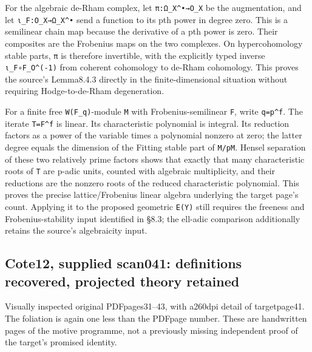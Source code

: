 \documentclass[
  10pt,
]{article}
\begin{document}
For the algebraic de-Rham complex, let
\texttt{\small π:\allowbreak{}Ω\_\allowbreak{}X\textasciicircum{}•→\allowbreak{}O\_\allowbreak{}X}
be the augmentation, and let
\texttt{\small ι\_\allowbreak{}F:\allowbreak{}O\_\allowbreak{}X→\allowbreak{}Ω\_\allowbreak{}X\textasciicircum{}•}
send a function to its pth power in degree zero. This is a semilinear
chain map because the derivative of a pth power is zero. Their
composites are the Frobenius maps on the two complexes. On
hypercohomology stable parts, \texttt{\small π} is therefore invertible,
with the explicitly typed inverse
\texttt{\small ι\_\allowbreak{}F∘F\_\allowbreak{}O\textasciicircum{}(\allowbreak{}-\allowbreak{}1)\allowbreak{}}
from coherent cohomology to de-Rham cohomology. This proves the source's
Lemma8.4.3 directly in the finite-dimensional situation without
requiring Hodge-to-de-Rham degeneration.

For a finite free
\texttt{\small W(\allowbreak{}F\_\allowbreak{}q)\allowbreak{}}-module
\texttt{\small M} with Frobenius-semilinear \texttt{\small F}, write
\texttt{\small q=\allowbreak{}p\textasciicircum{}f}. The iterate
\texttt{\small T=\allowbreak{}F\textasciicircum{}f} is linear. Its
characteristic polynomial is integral. Its reduction factors as a power
of the variable times a polynomial nonzero at zero; the latter degree
equals the dimension of the Fitting stable part of
\texttt{\small M/\allowbreak{}pM}. Hensel separation of these two
relatively prime factors shows that exactly that many characteristic
roots of \texttt{\small T} are p-adic units, counted with algebraic
multiplicity, and their reductions are the nonzero roots of the reduced
characteristic polynomial. This proves the precise lattice/Frobenius
linear algebra underlying the target page's count. Applying it to the
proposed geometric \texttt{\small E(\allowbreak{}Y)\allowbreak{}} still
requires the freeness and Frobenius-stability input identified in §8.3;
the ell-adic comparison additionally retains the source's algebraicity
input.

\subsection{Cote12, supplied scan041: definitions recovered, projected
theory
retained}\label{cote12-supplied-scan041-definitions-recovered-projected-theory-retained}

Visually inspected original PDFpages31--43, with a260dpi detail of
targetpage41. The foliation is again one less than the PDFpage number.
These are handwritten pages of the motive programme, not a previously
missing independent proof of the target's promised identity.
\end{document}
